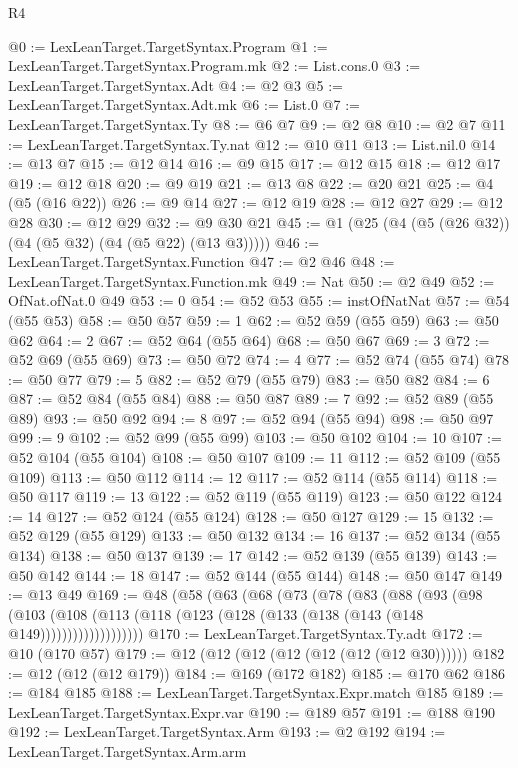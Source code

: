 \begin{lexlean}{R4}
\begin{coremodule}
@0 := LexLeanTarget.TargetSyntax.Program
@1 := LexLeanTarget.TargetSyntax.Program.mk
@2 := List.cons.{0}
@3 := LexLeanTarget.TargetSyntax.Adt
@4 := @2 @3
@5 := LexLeanTarget.TargetSyntax.Adt.mk
@6 := List.{0}
@7 := LexLeanTarget.TargetSyntax.Ty
@8 := @6 @7
@9 := @2 @8
@10 := @2 @7
@11 := LexLeanTarget.TargetSyntax.Ty.nat
@12 := @10 @11
@13 := List.nil.{0}
@14 := @13 @7
@15 := @12 @14
@16 := @9 @15
@17 := @12 @15
@18 := @12 @17
@19 := @12 @18
@20 := @9 @19
@21 := @13 @8
@22 := @20 @21
@25 := @4 (@5 (@16 @22))
@26 := @9 @14
@27 := @12 @19
@28 := @12 @27
@29 := @12 @28
@30 := @12 @29
@32 := @9 @30 @21
@45 := @1 (@25 (@4 (@5 (@26 @32)) (@4 (@5 @32) (@4 (@5 @22) (@13 @3)))))
@46 := LexLeanTarget.TargetSyntax.Function
@47 := @2 @46
@48 := LexLeanTarget.TargetSyntax.Function.mk
@49 := Nat
@50 := @2 @49
@52 := OfNat.ofNat.{0} @49
@53 := 0
@54 := @52 @53
@55 := instOfNatNat
@57 := @54 (@55 @53)
@58 := @50 @57
@59 := 1
@62 := @52 @59 (@55 @59)
@63 := @50 @62
@64 := 2
@67 := @52 @64 (@55 @64)
@68 := @50 @67
@69 := 3
@72 := @52 @69 (@55 @69)
@73 := @50 @72
@74 := 4
@77 := @52 @74 (@55 @74)
@78 := @50 @77
@79 := 5
@82 := @52 @79 (@55 @79)
@83 := @50 @82
@84 := 6
@87 := @52 @84 (@55 @84)
@88 := @50 @87
@89 := 7
@92 := @52 @89 (@55 @89)
@93 := @50 @92
@94 := 8
@97 := @52 @94 (@55 @94)
@98 := @50 @97
@99 := 9
@102 := @52 @99 (@55 @99)
@103 := @50 @102
@104 := 10
@107 := @52 @104 (@55 @104)
@108 := @50 @107
@109 := 11
@112 := @52 @109 (@55 @109)
@113 := @50 @112
@114 := 12
@117 := @52 @114 (@55 @114)
@118 := @50 @117
@119 := 13
@122 := @52 @119 (@55 @119)
@123 := @50 @122
@124 := 14
@127 := @52 @124 (@55 @124)
@128 := @50 @127
@129 := 15
@132 := @52 @129 (@55 @129)
@133 := @50 @132
@134 := 16
@137 := @52 @134 (@55 @134)
@138 := @50 @137
@139 := 17
@142 := @52 @139 (@55 @139)
@143 := @50 @142
@144 := 18
@147 := @52 @144 (@55 @144)
@148 := @50 @147
@149 := @13 @49
@169 := @48
    (@58
      (@63
        (@68
          (@73
            (@78
              (@83
                (@88
                  (@93
                    (@98
                      (@103
                        (@108
                          (@113 (@118 (@123 (@128 (@133 (@138 (@143 (@148 @149)))))))))))))))))))
@170 := LexLeanTarget.TargetSyntax.Ty.adt
@172 := @10 (@170 @57)
@179 := @12 (@12 (@12 (@12 (@12 (@12 (@12 @30))))))
@182 := @12 (@12 (@12 @179))
@184 := @169 (@172 @182)
@185 := @170 @62
@186 := @184 @185
@188 := LexLeanTarget.TargetSyntax.Expr.match @185
@189 := LexLeanTarget.TargetSyntax.Expr.var
@190 := @189 @57
@191 := @188 @190
@192 := LexLeanTarget.TargetSyntax.Arm
@193 := @2 @192
@194 := LexLeanTarget.TargetSyntax.Arm.arm

\end{coremodule}
\end{lexlean}
